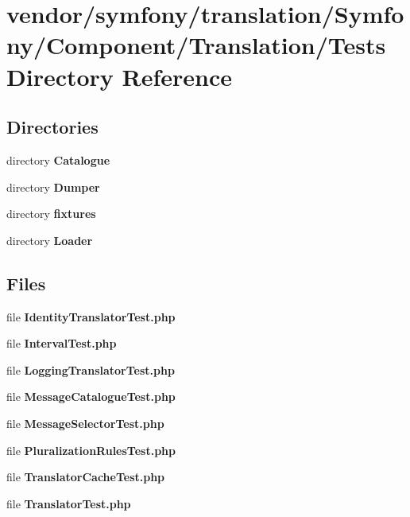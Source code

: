 \section{vendor/symfony/translation/\+Symfony/\+Component/\+Translation/\+Tests Directory Reference}
\label{dir_8f039272e62c7b521c2184558d86a7b0}
\subsection*{Directories}
\begin{DoxyCompactItemize}
\item 
directory {\bf Catalogue}
\item 
directory {\bf Dumper}
\item 
directory {\bf fixtures}
\item 
directory {\bf Loader}
\end{DoxyCompactItemize}
\subsection*{Files}
\begin{DoxyCompactItemize}
\item 
file {\bf Identity\+Translator\+Test.\+php}
\item 
file {\bf Interval\+Test.\+php}
\item 
file {\bf Logging\+Translator\+Test.\+php}
\item 
file {\bf Message\+Catalogue\+Test.\+php}
\item 
file {\bf Message\+Selector\+Test.\+php}
\item 
file {\bf Pluralization\+Rules\+Test.\+php}
\item 
file {\bf Translator\+Cache\+Test.\+php}
\item 
file {\bf Translator\+Test.\+php}
\end{DoxyCompactItemize}
